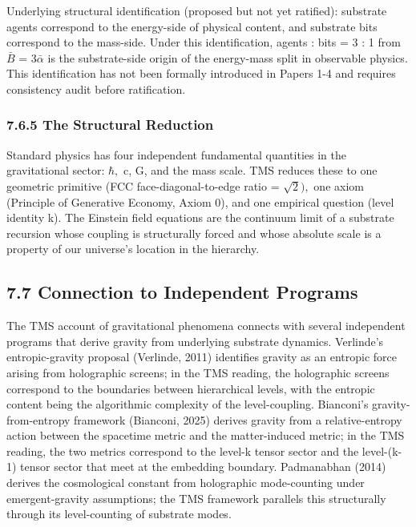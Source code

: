 \documentclass[11pt,oneside]{report}
\theoremstyle{definition}
\theoremstyle{remark}
\begin{document}
Underlying structural identification (proposed but not yet ratified):
substrate agents correspond to the energy-side of physical content, and
substrate bits correspond to the mass-side. Under this identification,
agents : bits = 3 : 1 from \ensuremath{\bar{B}} = \ensuremath{3\bar{\alpha}} is the substrate-side origin of the
energy-mass split in observable physics. This identification has not
been formally introduced in Papers 1-4 and requires consistency audit
before ratification.

\subsubsection*{7.6.5 The Structural Reduction}

Standard physics has four independent fundamental quantities in the
gravitational sector: \ensuremath{\hbar ,} c, G, and the mass scale. TMS reduces these to
one geometric primitive (FCC face-diagonal-to-edge ratio = \ensuremath{\sqrt{2}),} one
axiom (Principle of Generative Economy, Axiom 0), and one empirical
question (level identity k). The Einstein field equations are the
continuum limit of a substrate recursion whose coupling is structurally
forced and whose absolute scale is a property of our universe's location
in the hierarchy.

\subsection*{7.7 Connection to Independent Programs}

The TMS account of gravitational phenomena connects with several
independent programs that derive gravity from underlying substrate
dynamics. Verlinde's entropic-gravity proposal (Verlinde, 2011)
identifies gravity as an entropic force arising from holographic
screens; in the TMS reading, the holographic screens correspond to the
boundaries between hierarchical levels, with the entropic content being
the algorithmic complexity of the level-coupling. Bianconi's
gravity-from-entropy framework (Bianconi, 2025) derives gravity from a
relative-entropy action between the spacetime metric and the
matter-induced metric; in the TMS reading, the two metrics correspond to
the level-k tensor sector and the level-(k-1) tensor sector that meet at
the embedding boundary. Padmanabhan (2014) derives the cosmological
constant from holographic mode-counting under emergent-gravity
assumptions; the TMS framework parallels this structurally through its
level-counting of substrate modes.
\end{document}

